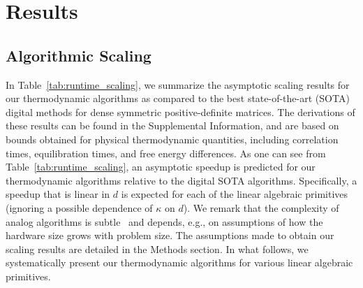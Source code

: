 \documentclass[prx,onecolumn,floatfix,longbibliography,notitlepage, nofootinbib,12pt]{revtex4-2}
\begin{document}
\section{Results}





\subsection{Algorithmic Scaling}

In Table~\ref{tab:runtime_scaling}, we summarize the asymptotic scaling results for our thermodynamic algorithms as compared to the best state-of-the-art (SOTA) digital methods for dense symmetric positive-definite matrices. The derivations of these results can be found in the Supplemental Information, and are based on bounds obtained for physical thermodynamic quantities, including correlation times, equilibration times, and free energy differences. As one can see from Table~\ref{tab:runtime_scaling}, an asymptotic speedup is predicted for our thermodynamic algorithms relative to the digital SOTA algorithms. Specifically, a speedup that is linear in $d$ is expected for each of the linear algebraic primitives (ignoring a possible dependence of $\kappa$ on $d$). We remark that the complexity of analog algorithms is subtle~\cite{valiant2023matrix} and depends, e.g., on assumptions of how the hardware size grows with problem size. The assumptions made to obtain our scaling results are detailed in the Methods section. In what follows, we systematically present our thermodynamic algorithms for various linear algebraic primitives.
\end{document}
